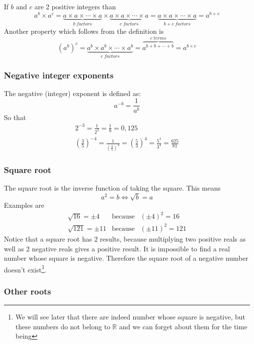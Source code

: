 \noindent If $b$ and $c$ are 2 positive integers than
$$
a^b \times a^c = \underbrace{a \times a \times \cdots \times a}_{b \; factors} \times \underbrace{a \times a \times \cdots \times a}_{c \; factors} = \underbrace{a \times a \times \cdots \times a}_{b+c \; factors} = a^{b+c}
$$
Another property which follows from the definition is
$$
\left( a^b \right)^c = \underbrace{a^b \times a^b \times \cdots \times a^b}_{c \; factors} = \overbrace{a^{b + b + \cdots + b}}^{c \; terms} = a^{b \times c} 
$$

\subsubsection{Negative integer exponents}

\noindent The negative (integer) exponent is defined as:
$$
a^{-b} = \frac{1}{a^b}
$$
So that
\begin{eqnarray*}
2^{-3} = \frac{1}{2^3} = \frac{1}{8} = 0,125 \\
\left( \frac{3}{5} \right)^{-4} = \frac{1}{\left( \frac{3}{5} \right)^4} = \left( \frac{5}{3} \right)^4 = \frac{5^4}{3^4} = \frac{625}{81}
\end{eqnarray*}

\subsubsection{Square root}

\noindent The square root is the inverse function of taking the square. This means
$$
a^2 = b \Leftrightarrow \sqrt{b} = a
$$
Examples are
\begin{eqnarray*}
\sqrt{16} = \pm 4 & \text{because} & \left( \pm 4 \right)^2 = 16 \\
 \sqrt{121} = \pm 11 & \text{because} & \left( \pm 11 \right)^2 = 121
\end{eqnarray*}
Notice that a square root has 2 results, because multiplying two positive reals as well as 2 negative reals gives a positive result. It is impossible to find a real number whose square is negative. Therefore the square root of a negative number doesn't exist\footnote{We will see later that there are indeed number whose square is negative, but these numbers do not belong to $\mathbb{R}$ and we can forget about them for the time being}.

\subsubsection{Other roots}

